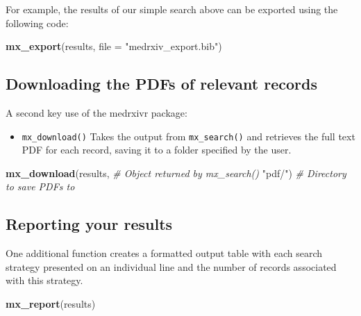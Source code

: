 \documentclass[a4paper, twoside]{templates/ociamthesis}
\providecommand{\tightlist}{%
  \setlength{\itemsep}{0pt}\setlength{\parskip}{0pt}}
\newenvironment{Shaded}{\begin{snugshade}}{\end{snugshade}}
\newcommand{\CommentTok}[1]{\textcolor[rgb]{0.56,0.35,0.01}{\textit{#1}}}
\newcommand{\DataTypeTok}[1]{\textcolor[rgb]{0.13,0.29,0.53}{#1}}
\newcommand{\KeywordTok}[1]{\textcolor[rgb]{0.13,0.29,0.53}{\textbf{#1}}}
\newcommand{\NormalTok}[1]{#1}
\newcommand{\StringTok}[1]{\textcolor[rgb]{0.31,0.60,0.02}{#1}}
\renewenvironment{Shaded}
{
  \vspace{4pt}%
  \begin{snugshade}%
}{%
  \end{snugshade}%
  \vspace{4pt}%
}
\begin{document}
For example, the results of our simple search above can be exported using the following code:

\begin{Shaded}
\begin{Highlighting}[]
\KeywordTok{mx_export}\NormalTok{(results, }
          \DataTypeTok{file =} \StringTok{"medrxiv_export.bib"}\NormalTok{)}
\end{Highlighting}
\end{Shaded}

\hypertarget{downloading-the-pdfs-of-relevant-records}{%
\subsection{Downloading the PDFs of relevant records}\label{downloading-the-pdfs-of-relevant-records}}

A second key use of the medrxivr package:

\begin{itemize}
\tightlist
\item
  \texttt{mx\_download()} Takes the output from \texttt{mx\_search()} and retrieves the full text PDF for each record, saving it to a folder specified by the user.
\end{itemize}

\begin{Shaded}
\begin{Highlighting}[]
\KeywordTok{mx_download}\NormalTok{(results,        }\CommentTok{# Object returned by mx_search()}
            \StringTok{"pdf/"}\NormalTok{)         }\CommentTok{# Directory to save PDFs to }
\end{Highlighting}
\end{Shaded}

\hypertarget{reporting-your-results}{%
\subsection{Reporting your results}\label{reporting-your-results}}

One additional function creates a formatted output table with each search strategy presented on an individual line and the number of records associated with this strategy.

\begin{Shaded}
\begin{Highlighting}[]
\KeywordTok{mx_report}\NormalTok{(results)}
\end{Highlighting}
\end{Shaded}
\end{document}
